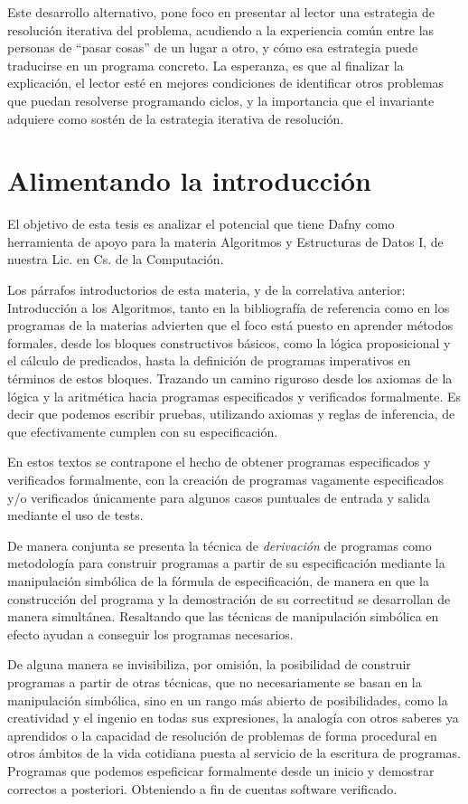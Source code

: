 \documentclass[12pt, a4paper, openany, fleqn]{book}
\begin{document}
    Este desarrollo alternativo, pone foco en presentar al lector una estrategia de resolución iterativa del problema, acudiendo a la experiencia común entre las personas de ``pasar cosas'' de un lugar a otro, y cómo esa estrategia puede traducirse en un programa concreto.
    La esperanza, es que al finalizar la explicación, el lector esté en mejores condiciones de identificar otros problemas que puedan resolverse programando ciclos, y la importancia que el invariante adquiere como sostén de la estrategia iterativa de resolución.


    \chapter{Alimentando la introducción}
    El objetivo de esta tesis es analizar el potencial que tiene Dafny como herramienta de apoyo para la materia Algoritmos y Estructuras de Datos I, de nuestra Lic. en Cs. de la Computación.

    Los párrafos introductorios de esta materia, y de la correlativa anterior: Introducción a los Algoritmos, tanto en la bibliografía de referencia como en los programas de la materias advierten que el foco está puesto en aprender métodos formales, desde los bloques constructivos básicos, como la lógica proposicional y el cálculo de predicados, hasta la definición de programas imperativos en términos de estos bloques. Trazando un camino riguroso desde los axiomas de la lógica y la aritmética hacia programas especificados y verificados formalmente. Es decir que podemos escribir pruebas, utilizando axiomas y reglas de inferencia, de que efectivamente cumplen con su especificación.

    En estos textos se contrapone el hecho de obtener programas especificados y verificados formalmente, con la creación de programas vagamente especificados y/o verificados únicamente para algunos casos puntuales de entrada y salida mediante el uso de tests.

    De manera conjunta se presenta la técnica de \textit{derivación} de programas como metodología para construir programas a partir de su especificación mediante la manipulación simbólica de la fórmula de especificación, de manera en que la construcción del programa y la demostración de su correctitud se desarrollan de manera simultánea. Resaltando que las técnicas de manipulación simbólica en efecto ayudan a conseguir los programas necesarios.

    De alguna manera se invisibiliza, por omisión, la posibilidad de construir programas a partir de otras técnicas, que no necesariamente se basan en la manipulación simbólica, sino en un rango más abierto de posibilidades, como la creatividad y el ingenio en todas  sus expresiones, la analogía con otros saberes ya aprendidos o la capacidad de resolución de problemas de forma procedural en otros ámbitos de la vida cotidiana puesta al servicio de la escritura de programas. Programas que podemos espeficicar formalmente desde un inicio y demostrar correctos a posteriori. Obteniendo a fin de cuentas software verificado.
\end{document}
